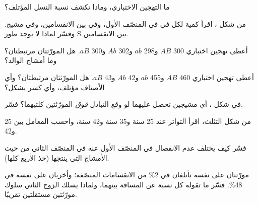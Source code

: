 \begin{exercise}[$\star$]\label{exo:g12:meiosis-genetic-shuffling:5}
ما التهجين الاختباري، وماذا تكشف نسبة النسل المؤتلف؟
\end{exercise}

\begin{exercise}[$\star\star$]\label{exo:g12:meiosis-genetic-shuffling:6}
من شكل ، اقرأ كمية  لكل  في  في المنصّف الأول، وفي 
بين الانقسامين، وفي مشيج. وفسّر لماذا لا يوجد طور S بين الانقسامين.
\end{exercise}

\begin{exercise}[$\star\star$]\label{exo:g12:meiosis-genetic-shuffling:7}
أعطى تهجين اختباري 300 $AB$ و298 $ab$ و302 $Ab$ و300 $aB$. هل
المورّثتان مرتبطتان؟ وما أمشاج الوالد؟
\end{exercise}

\begin{exercise}[$\star\star$]\label{exo:g12:meiosis-genetic-shuffling:8}
أعطى تهجين اختباري 460 $AB$ و455 $ab$ و42 $Ab$ و43 $aB$. هل المورّثتان
مرتبطتان؟ وأي الأصناف مؤتلف، وأي كسر يشكل؟
\end{exercise}

\begin{exercise}[$\star\star$]\label{exo:g12:meiosis-genetic-shuffling:9}
في شكل ، أي مشيجين تحصل عليهما لو وقع التبادل \emph{فوق}
المورّثتين كلتيهما؟ فسّر.
\end{exercise}

\begin{exercise}[$\star\star$]\label{exo:g12:meiosis-genetic-shuffling:10}
من شكل التثلث، اقرأ التواتر عند 25 سنة و35 سنة و42 سنة، واحسب المعامل
بين 25 و42.
\end{exercise}

\begin{exercise}[$\star\star$]\label{exo:g12:meiosis-genetic-shuffling:11}
فسّر كيف يختلف عدم الانفصال في المنصّف الأول عنه في المنصّف الثاني من
حيث الأمشاج التي ينتجها (خذ  الأربع كلها).
\end{exercise}

\begin{exercise}[$\star\star\star$]\label{exo:g12:meiosis-genetic-shuffling:12}
مورّثتان على  نفسه تأتلفان في 2\% من الانقسامات المنصّفة؛
وأخريان على  نفسه في 48\%. فسّر ما تقوله كل نسبة عن المسافة
بينهما، ولماذا يسلك الزوج الثاني سلوك مورّثتين مستقلتين تقريبًا.
\end{exercise}

